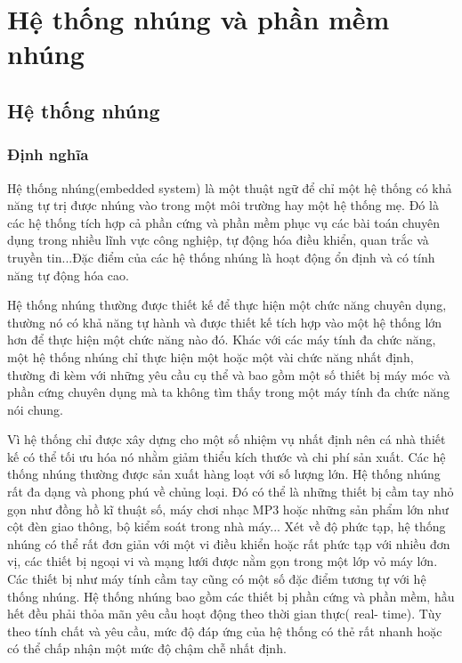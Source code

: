 \chapter{Hệ thống nhúng và phần mềm nhúng}

    \section{Hệ thống nhúng}

        \subsection{Định nghĩa}
Hệ thống nhúng(embedded system) là một thuật ngữ để chỉ một hệ thống có khả năng tự trị được nhúng vào trong một môi trường hay một hệ thống mẹ. Đó là  các hệ thống tích hợp cả phần cứng và phần mềm phục vụ các bài toán chuyên dụng trong nhiều lĩnh vực công nghiệp, tự động hóa điều khiển, quan trắc và truyền tin...Đặc điểm của các hệ thống nhúng là hoạt động ổn định và có tính năng tự động hóa cao.

Hệ thống nhúng thường được thiết kế để thực hiện một chức năng chuyên dụng, thường nó có khả năng tự hành và được thiết kế tích hợp vào một hệ thống lớn hơn để thực hiện một chức năng nào đó. Khác với các máy tính đa chức năng, một hệ thống nhúng chỉ thực hiện một hoặc một vài chức năng nhất định, thường đi kèm với những yêu cầu cụ thể và bao gồm một số thiết bị máy móc và phần cứng chuyên dụng mà ta không tìm thấy trong một máy tính đa chức năng nói chung.

Vì hệ thống chỉ được xây dựng cho một số nhiệm vụ nhất định nên cá nhà thiết kế có thể tối ưu hóa nó nhằm giảm thiểu kích thước và chi phí sản xuất. Các hệ thống nhúng thường được sản xuất hàng loạt với số lượng lớn. Hệ thống nhúng rất đa dạng và phong phú về chủng loại. Đó có thể là những thiết bị cầm tay nhỏ gọn như đồng hồ kĩ thuật số, máy chơi nhạc MP3 hoặc những sản phẩm lớn như cột đèn giao thông, bộ kiểm soát trong nhà máy... Xét về độ phức tạp, hệ thống nhúng có thể rất đơn giản với một vi điều khiển hoặc rất phức tạp với nhiều đơn vị, các thiết bị ngoại vi và mạng lưới được nằm gọn trong một lớp vỏ máy lớn. Các thiết bị như máy tính cầm tay cũng có một số đặc điểm tương tự với hệ thống nhúng.
Hệ thống nhúng bao gồm các thiết bị  phần cứng và phần mềm, hầu hết đều phải thỏa mãn yêu cầu hoạt động theo thời gian thực( real- time). Tùy theo tính chất và yêu cầu, mức độ đáp ứng của hệ thống có thẻ rất nhanh hoặc có thể chấp nhận một mức độ chậm chễ nhất định.

